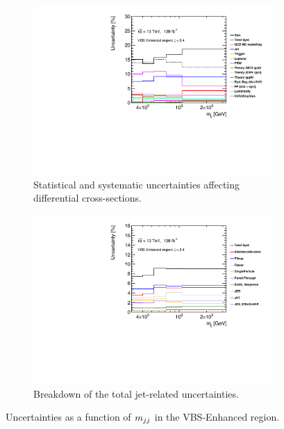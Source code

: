 \begin{figure}[!htbp]
    \centering
    \begin{subfigure}{.49\textwidth}
        \centering
        \includegraphics[width=.98\linewidth]{figures/Analysis/Systematics/systematics_VBS_Enhanced.pdf}
        \caption{ Statistical and systematic uncertainties affecting differential cross-sections. \label{fig:sys_mjj_VBS_Enhanced_total}}
    \end{subfigure}
    \begin{subfigure}{.49\textwidth}
        \centering
        \includegraphics[width=.98\linewidth]{figures/Analysis/Systematics/jet_systematics_VBS_Enhanced.pdf}
        \caption{Breakdown of the total jet-related uncertainties. \label{fig:sys_mjj_VBS_Enhanced_jet} }
    \end{subfigure}
    \caption{Uncertainties as a function of $m_{jj}$ in the VBS-Enhanced region. \label{fig:sys_mjj_VBS_Enhanced}}
    \end{figure}